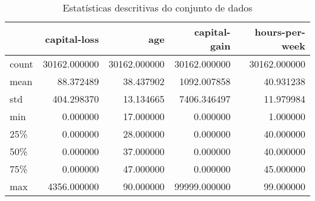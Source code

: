 \begin{table}
\centering
\caption{Estatísticas descritivas do conjunto de dados}
\label{tbl:descriptive_statistics}
\begin{tabular}{lrrrr}
\toprule
{} &  capital-loss &           age &  capital-gain &  hours-per-week \\
\midrule
count &  30162.000000 &  30162.000000 &  30162.000000 &    30162.000000 \\
mean  &     88.372489 &     38.437902 &   1092.007858 &       40.931238 \\
std   &    404.298370 &     13.134665 &   7406.346497 &       11.979984 \\
min   &      0.000000 &     17.000000 &      0.000000 &        1.000000 \\
25\%   &      0.000000 &     28.000000 &      0.000000 &       40.000000 \\
50\%   &      0.000000 &     37.000000 &      0.000000 &       40.000000 \\
75\%   &      0.000000 &     47.000000 &      0.000000 &       45.000000 \\
max   &   4356.000000 &     90.000000 &  99999.000000 &       99.000000 \\
\bottomrule
\end{tabular}
\end{table}
